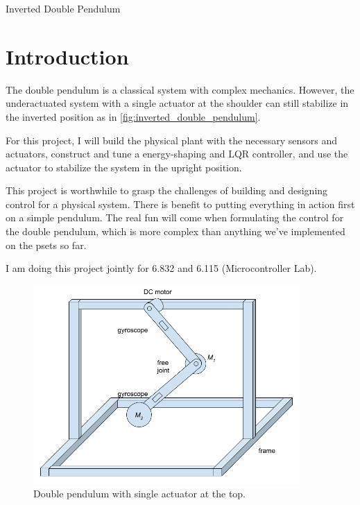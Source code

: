 \documentclass{article}
\begin{document}
\begin{center}
	\huge
	Inverted Double Pendulum
\end{center}

\section{Introduction}

The double pendulum is a classical system with complex mechanics. However, the underactuated system with a single actuator at the shoulder can still stabilize in the inverted position as in \cref{fig:inverted_double_pendulum}.

For this project, I will build the physical plant with the necessary sensors and actuators, construct and tune a energy-shaping and LQR controller, and use the actuator to stabilize the system in the upright position.

This project is worthwhile to grasp the challenges of building and designing control for a physical system. There is benefit to putting everything in action first on a simple pendulum. The real fun will come when formulating the control for the double pendulum, which is more complex than anything we've implemented on the psets so far.

I am doing this project jointly for 6.832 and 6.115 (Microcontroller Lab).

\begin{figure}[h]
	\centering
	\includegraphics[width=4in]{double_pendulum.png}
	\caption{Double pendulum with single actuator at the top.}
	\label{fig:double_pendulum}
\end{figure}
\end{document}
